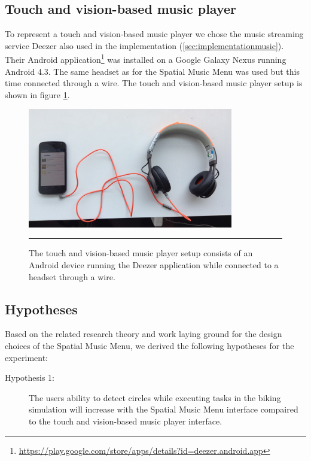 \subsection{Touch and vision-based music player}
To represent a touch and vision-based music player we chose the music streaming service Deezer also used in the implementation (\ref{sec:implementationmusic}). Their Android application\footnote{\url{https://play.google.com/store/apps/details?id=deezer.android.app}} was installed on a Google Galaxy Nexus running Android 4.3. The same headset as for the Spatial Music Menu was used but this time connected through a wire. The touch and vision-based music player setup is shown in figure \ref{fig:touchandvisionsystem}.

\begin{figure}[h]
	\centering
		\includegraphics[width=0.8\textwidth,height=\textheight,keepaspectratio]{./Figures/evaluation_visionplayer.jpg}
		\rule{35em}{1pt}
	\caption[Touch and vision-based system]{The touch and vision-based music player setup consists of an Android device running the Deezer application while connected to a headset through a wire.}
	\label{fig:touchandvisionsystem}
\end{figure}

\subsection{Hypotheses}
\label{sec:evaluationhypothesis}
Based on the related research theory and work laying ground for the design choices of the Spatial Music Menu, we derived the following hypotheses for the experiment:

\begin{description}
\item[Hypothesis 1:] The users ability to detect circles while executing tasks in the biking simulation will increase with the Spatial Music Menu interface compaired to the touch and vision-based music player interface.
\end{description}

